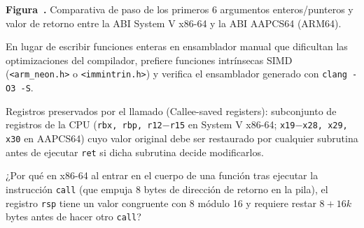 \documentclass{book}
\newcounter{studiumfigure}
\begin{document}
\begin{minipage}{\linewidth}
\begin{tikzpicture}
\end{tikzpicture}%
\fi
\fi
\endgroup
\par\nopagebreak
{\small {}\label{fig:fig-abi-calling-conventions}\textbf{Figura~\thestudiumfigure.} Comparativa de paso de los primeros 6 argumentos enteros/punteros y valor de retorno entre la ABI System V x86-64 y la ABI AAPCS64 (ARM64).\par}
\end{minipage}
\par\vspace{\baselineskip}

\begin{tcolorbox}[title={Consejo}, studiumtip, breakable]

En lugar de escribir funciones enteras en ensamblador manual que dificultan las optimizaciones del compilador, prefiere funciones intrínsecas SIMD (\texttt{<arm\_neon.h>} o \texttt{<immintrin.h>}) y verifica el ensamblador generado con \texttt{clang -O3 -S}.
\end{tcolorbox}

\begin{tcolorbox}[title={Definición}, studiumdef, breakable]

Registros preservados por el llamado (Callee-saved registers): subconjunto de registros de la CPU (\texttt{rbx, rbp, r12\ensuremath{-}r15} en System V x86-64; \texttt{x19\ensuremath{-}x28, x29, x30} en AAPCS64) cuyo valor original debe ser restaurado por cualquier subrutina antes de ejecutar \texttt{ret} si dicha subrutina decide modificarlos.
\end{tcolorbox}

\begin{tcolorbox}[title={Autoficha}, studiumcheck, breakable]

¿Por qué en x86-64 al entrar en el cuerpo de una función tras ejecutar la instrucción \texttt{call} (que empuja 8 bytes de dirección de retorno en la pila), el registro \texttt{rsp} tiene un valor congruente con 8 módulo 16 y requiere restar \(8 + 16k\) bytes antes de hacer otro \texttt{call}?
\end{tcolorbox}
\end{document}
